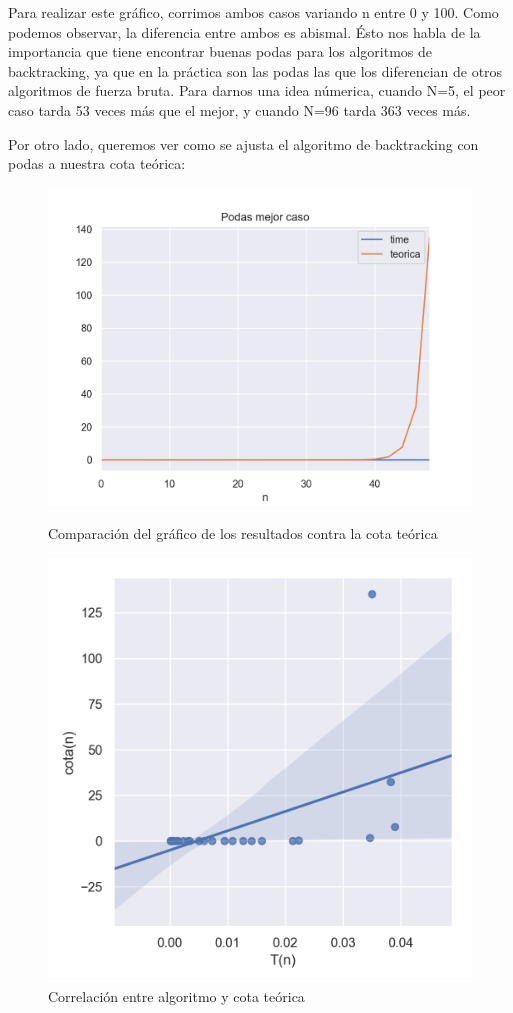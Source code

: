 Para realizar este gráfico, corrimos ambos casos variando n entre 0 y 100. Como podemos observar, la diferencia entre ambos es abismal. Ésto nos habla de la importancia que tiene encontrar buenas podas para los algoritmos de backtracking, ya que en la práctica son las podas las que los diferencian de otros algoritmos de fuerza bruta. Para darnos una idea númerica, cuando N=5, el peor caso tarda 53 veces más que el mejor, y cuando N=96 tarda 363 veces más.

Por otro lado, queremos ver como se ajusta el algoritmo de backtracking con podas a nuestra cota teórica:

\begin{figure}[H]
   \begin{minipage}{0.5\textwidth}
     \centering
     \includegraphics[width=0.9\linewidth]{img/mejor_Figure_1}
     \caption{Comparación del gráfico de los resultados contra la cota teórica}
   \end{minipage}\hfill
   \begin{minipage}{0.5\textwidth}
     \centering
     \includegraphics[width=0.9\linewidth]{img/mejor_Figure_2}
     \caption{Correlación entre algoritmo y cota teórica}
   \end{minipage}
\end{figure}

